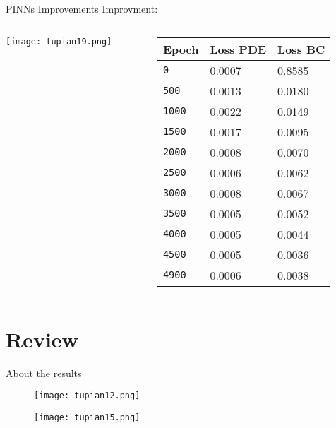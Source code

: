 \documentclass{beamer}
\begin{document}
\begin{frame}{PINNs Improvements}
Improvment:
    \begin{columns}
        \begin{column}{0.5\textwidth}
            \centering
            \texttt{[image: tupian19.png]} %
        \end{column}

        \begin{column}{0.5\textwidth}
            \begin{table}[!htbp]
                \centering
                \begin{tabular}{l  | l | l}
                \hline
                    Epoch & Loss PDE & Loss BC \\
                    \hline
                    \texttt{0}  & 0.0007 & 0.8585 \\
                    \texttt{500} & 0.0013 & 0.0180 \\
                    \texttt{1000} & 0.0022 & 0.0149 \\
                    \texttt{1500} & 0.0017 & 0.0095 \\
                    \texttt{2000} & 0.0008 & 0.0070 \\
                    \texttt{2500} & 0.0006 & 0.0062 \\
                    \texttt{3000} & 0.0008 & 0.0067 \\
                    \texttt{3500} & 0.0005 & 0.0052 \\
                    \texttt{4000} & 0.0005 & 0.0044 \\
                    \texttt{4500} & 0.0005 & 0.0036 \\
                    \texttt{4900} & 0.0006 & 0.0038 \\
                    \hline
                \end{tabular}
                \label{doc}
            \end{table}
        \end{column}
    \end{columns}
\end{frame}


\section{Review}
\begin{frame}{About the results}
    \begin{figure}
        \texttt{[image: tupian12.png]} %
        \vspace{0.05cm} %

        \texttt{[image: tupian15.png]} %
    \end{figure}
\end{frame}
\end{document}
